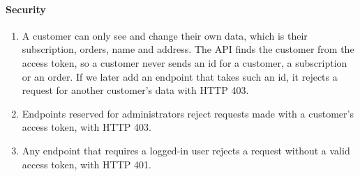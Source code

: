 \documentclass[a4paper,11pt]{article}
\begin{document}
\paragraph{Security}
\begin{enumerate}[label=\reqlabel{NFR}, start=9]
    \item A customer can only see and change their own data, which is their subscription, orders, name and address. The API finds the customer from the access token, so a customer never sends an id for a customer, a subscription or an order. If we later add an endpoint that takes such an id, it rejects a request for another customer's data with HTTP 403.
    \item Endpoints reserved for administrators reject requests made with a customer's access token, with HTTP 403.
    \item Any endpoint that requires a logged-in user rejects a request without a valid access token, with HTTP 401.
\end{enumerate}
\end{document}
